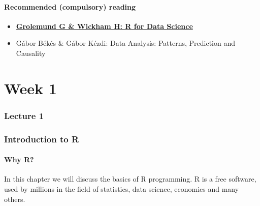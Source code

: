 \documentclass[
]{article}
\begin{document}
\hypertarget{recommended-compulsory-reading}{%
\subsection{Recommended (compulsory) reading}\label{recommended-compulsory-reading}}

\begin{itemize}
\item
  \href{http://r4ds.had.co.nz/}{\textbf{Grolemund G \& Wickham H:
  R for Data Science}}
\item
  Gábor Békés \& Gábor Kézdi: Data Analysis:
  Patterns, Prediction and Causality
\end{itemize}

\hypertarget{part-week-1}{%
\part*{Week 1}\label{part-week-1}}

\hypertarget{lecture1}{%
\section{Lecture 1}\label{lecture1}}

\hypertarget{seminar1}{%
\section{Introduction to R}\label{seminar1}}

\hypertarget{why-r}{%
\subsection{Why R?}\label{why-r}}

In this chapter we will discuss the basics of R programming.
R is a free software, used by millions in the field of statistics, data science, economics and many others.
\end{document}
